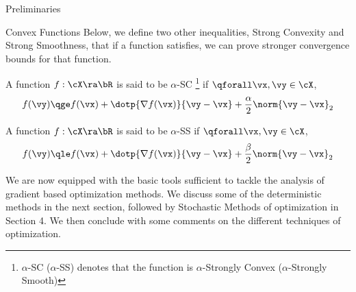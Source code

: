 \documentclass{article}
\begin{document}
\begin{psection}{Preliminaries}
\begin{psubsection}{Convex Functions}
		Below, we define two other inequalities, Strong Convexity and Strong Smoothness, that if a function satisfies, we can prove stronger convergence bounds for that function.
		\begin{definition}
			\label{def:sc}
			A function $f: \cX \ra \bR$ is said to be $\alpha$-SC \footnote{$\alpha$-SC ($\alpha$-SS) denotes that the function is $\alpha$-Strongly Convex ($\alpha$-Strongly Smooth)} if $\qforall \vx, \vy \in \cX$,
			\begin{equation}
				f(\vy)	\qge	f(\vx) + \dotp{\nabla f(\vx)}{\vy - \vx} + \frac{\alpha}{2} \norm{\vy - \vx}_2
				\label{eq:sc}
			\end{equation}
		\end{definition}

		\begin{definition}
			\label{def:ss}
			A function $f: \cX \ra \bR$ is said to be $\alpha$-SS if $\qforall \vx, \vy \in \cX$,
			\begin{equation}
				f(\vy)	\qle	f(\vx) + \dotp{\nabla f(\vx)}{\vy - \vx} + \frac{\beta}{2} \norm{\vy - \vx}_2
				\label{eq:ss}
			\end{equation}
		\end{definition}

	\end{psubsection}

	We are now equipped with the basic tools sufficient to tackle the analysis of gradient based optimization methods. We discuss some of the deterministic methods in the next section, followed by Stochastic Methods of optimization in Section 4. We then conclude with some comments on the different techniques of optimization.

\end{psection}
\end{document}
